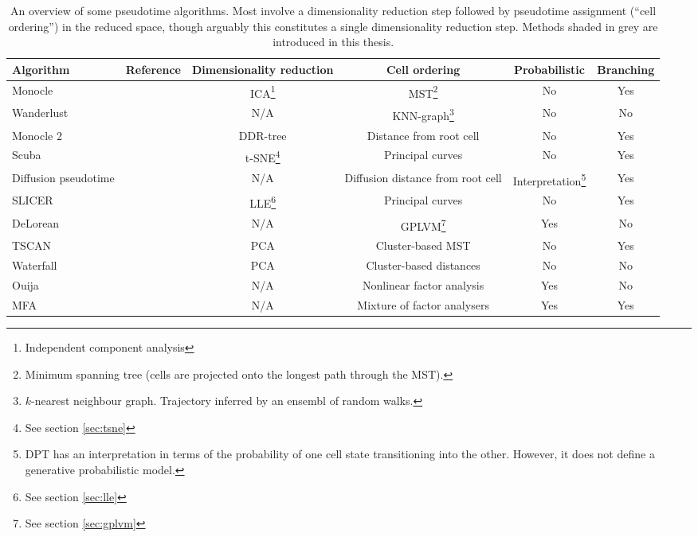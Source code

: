 \begin{sidewaystable}
  \centering
\begin{tabular}{|lccccc|}
\hline
Algorithm & Reference & Dimensionality reduction & Cell ordering & Probabilistic & Branching \\
\hline
Monocle & \cite{Trapnell2014-xi} & ICA\footnote{Independent component analysis} &
MST\footnote{Minimum spanning tree (cells are projected onto the longest path through the MST).} & No & Yes \\
Wanderlust & \cite{Bendall2014-rc} & N/A & KNN-graph\footnote{$k$-nearest neighbour graph. Trajectory inferred by an ensembl of random walks.} & No & No \\
Monocle 2 & \cite{Qiu2017-eu} & DDR-tree & Distance from root cell & No & Yes \\
Scuba & \cite{Marco2014-ug} & t-SNE\footnote{See section \ref{sec:tsne}} & Principal curves & No & Yes \\
Diffusion pseudotime & \cite{haghverdi2016diffusion} & N/A & Diffusion distance from root cell &
Interpretation\footnote{DPT has an interpretation in terms of the probability of one cell state transitioning into the other. However, it does not define a generative probabilistic model.} & Yes \\
SLICER & \cite{welch2016slicer} & LLE\footnote{See section \ref{sec:lle}} & Principal curves & No & Yes \\
DeLorean & \cite{Reid2016-yo} & N/A & GPLVM\footnote{See section \ref{sec:gplvm}} & Yes & No \\
TSCAN & \cite{Ji2016-gx} & PCA & Cluster-based MST & No & Yes \\
Waterfall & \cite{Shin2015} & PCA & Cluster-based distances & No & No \\
\rowcolor{Gray}
Ouija & \cite{Campbell2016-ys} & N/A & Nonlinear factor analysis & Yes & No \\
\rowcolor{Gray}
MFA & \cite{campbell2017probabilistic} & N/A & Mixture of factor analysers & Yes & Yes \\
\hline
\end{tabular}
\caption{An overview of some pseudotime algorithms. Most involve a dimensionality reduction step followed by pseudotime assignment (``cell ordering'') in the reduced space, though arguably this constitutes a single dimensionality reduction step. Methods shaded in grey are introduced in this thesis.} \label{tbl:pseudotimecomparison}
\end{sidewaystable}

